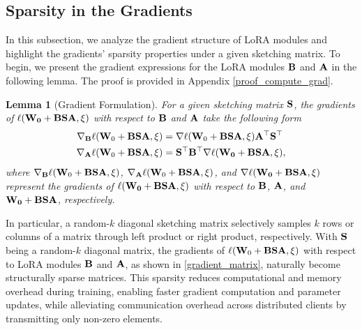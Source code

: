 \documentclass{article} %
\theoremstyle{plain}
\newtheorem{lemma}[theorem]{Lemma}
\theoremstyle{definition}
\newcommand{\eqdef}{\coloneqq}
\begin{document}

\subsection{Sparsity in the Gradients}
In this subsection, we analyze the gradient structure of LoRA modules and highlight the gradients' sparsity properties under a given sketching matrix. 
To begin, we present the gradient expressions for the LoRA modules \(\bf B\) and \(\bf A\) in the following lemma. The proof is provided in Appendix \ref{proof_compute_grad}.
\begin{lemma}[Gradient Formulation]\label{compute_grad}
For a given sketching matrix \(\bf S\), the gradients of  \( \ell(\bf W_0 + {\bf B}\bf S{\bf A}, \xi)\) with respect to ${\bf B}$ and ${\bf A}$ take the following form
\begin{equation}\label{gradient_matrix}
\begin{aligned}
    {\nabla}_{\bf B} \ell({\bf W}_0 + {\bf B} {\bf S} {\bf A}, \xi) &= \nabla \ell({\bf W}_0 + {\bf B} {\bf S} {\bf A}, \xi)  {\bf A}^{\top} {\bf S}^{\top} \\
    {\nabla}_{\bf A} \ell({\bf W}_0 + {\bf B} {\bf S} {\bf A}, \xi) &= {\bf S}^{\top} {\bf B}^{\top} \nabla \ell(\bf W_0 + {\bf B}\bf S{\bf A}, \xi),
\end{aligned}
\end{equation}
where \({\nabla}_{\bf B} \ell({\bf W}_0 + {\bf B} {\bf S} {\bf A}, \xi)\), \({\nabla}_{\bf A} \ell({\bf W}_0 + {\bf B} {\bf S} {\bf A}, \xi)\), and \(\nabla \ell(\bf W_0 + {\bf B}\bf S{\bf A}, \xi)\) represent the gradients of \(\ell(\bf W_0 + {\bf B}\bf S{\bf A}, \xi)\) with respect to \(\bf B\), \(\bf A\), and \(\bf W_0 + {\bf B}\bf S{\bf A}\), respectively. 
\end{lemma}

In particular, a random-$k$ diagonal sketching matrix selectively samples $k$ rows or columns of a matrix through left product or right product, respectively. With \({\bf S}\) being a random-$k$ diagonal matrix, the gradients of $\ell({\bf W}_0 + {\bf B} {\bf S} {\bf A}, \xi)$ with respect to LoRA modules \(\bf B\) and \(\bf A\), as shown in \eqref{gradient_matrix}, naturally become structurally sparse matrices. 
This sparsity reduces computational and memory overhead during training, enabling faster gradient computation and parameter updates, while alleviating communication overhead across distributed clients by transmitting only non-zero elements.
\end{document}
